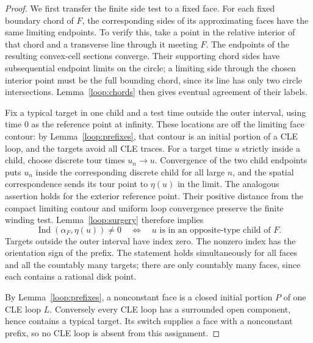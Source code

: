 \documentclass[11pt]{article}
\numberwithin{equation}{section}
\theoremstyle{definition}
\theoremstyle{remark}
\newcommand{\1}{\mathbf 1}
\begin{document}
\begin{proof}
We first transfer the finite side test to a fixed face.  For each fixed
boundary chord of $F$, the corresponding sides of its approximating
faces have the same limiting endpoints.  To verify this, take a point
in the relative interior of that chord and a transverse line through
it meeting $F$.  The endpoints of the resulting convex-cell sections
converge.  Their supporting chord sides have subsequential endpoint
limits on the circle; a limiting side through the chosen interior
point must be the full bounding chord, since its line has only two
circle intersections.  Lemma~\ref{loop:chords} then gives eventual
agreement of their labels.

Fix a typical target in one child and a test time outside the outer
interval, using time $0$ as the reference point at infinity.  These
locations are off the limiting face contour: by
Lemma~\ref{loop:prefixes}, that contour is an initial portion of a CLE
loop, and the targets avoid all CLE traces.  For a target time $u$
strictly inside a child, choose discrete tour times $u_n\to u$.
Convergence of the two child endpoints puts $u_n$ inside the
corresponding discrete child for all large $n$, and the spatial
correspondence sends its tour point to $\eta(u)$ in the limit.
The analogous assertion holds for the exterior reference point.
Their positive distance from the compact limiting contour and uniform
loop convergence preserve the finite winding test.
Lemma~\ref{loop:surgery} therefore implies
\begin{equation}\label{loop:side-test}
 \operatorname{Ind}(\alpha_F,\eta(u))\ne0
 \quad\Longleftrightarrow\quad
 u\text{ is in an opposite-type child of }F.
\end{equation}
Targets outside the outer interval have index zero.  The nonzero
index has the orientation sign of the prefix.  The statement holds
simultaneously for all faces and all the countably many targets;
there are only countably many faces, since each contains a rational
disk point.

By Lemma~\ref{loop:prefixes}, a nonconstant face is a closed initial
portion $P$ of one CLE loop $L$.  Conversely every CLE loop has a
surrounded open component, hence contains a typical target.  Its
switch supplies a face with a nonconstant prefix, so no CLE loop is
absent from this assignment.


\end{proof}
\end{document}
